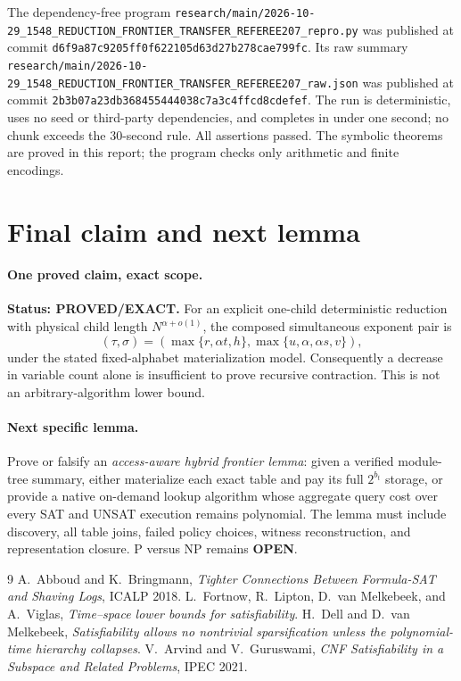 \documentclass[11pt]{article}
\newcommand{\Status}[1]{\textbf{Status: #1.}}
\begin{document}
The dependency-free program
\texttt{research/main/2026-10-29\_1548\_REDUCTION\_FRONTIER\_TRANSFER\_REFEREE207\_repro.py}
was published at commit \texttt{d6f9a87c9205ff0f622105d63d27b278cae799fc}.  Its raw summary
\texttt{research/main/2026-10-29\_1548\_REDUCTION\_FRONTIER\_TRANSFER\_REFEREE207\_raw.json}
was published at commit \texttt{2b3b07a23db368455444038c7a3c4ffcd8cdefef}.  The run is
deterministic, uses no seed or third-party dependencies, and completes in under one second; no chunk
exceeds the 30-second rule.  All assertions passed.  The symbolic theorems are proved in this report;
the program checks only arithmetic and finite encodings.

\section{Final claim and next lemma}

\paragraph{One proved claim, exact scope.}
\Status{PROVED/EXACT} For an explicit one-child deterministic reduction with physical child length
$N^{\alpha+o(1)}$, the composed simultaneous exponent pair is
\[
(\tau,\sigma)=
(\max\{r,\alpha t,h\},\max\{u,\alpha,\alpha s,v\}),
\]
under the stated fixed-alphabet materialization model.  Consequently a decrease in variable count
alone is insufficient to prove recursive contraction.  This is not an arbitrary-algorithm lower bound.

\paragraph{Next specific lemma.}
Prove or falsify an \emph{access-aware hybrid frontier lemma}: given a verified module-tree summary,
either materialize each exact table and pay its full $2^{b_t}$ storage, or provide a native on-demand
lookup algorithm whose aggregate query cost over every SAT and UNSAT execution remains polynomial.
The lemma must include discovery, all table joins, failed policy choices, witness reconstruction, and
representation closure.  P versus NP remains \textbf{OPEN}.

\begin{thebibliography}{9}
 A.~Abboud and K.~Bringmann,
\emph{Tighter Connections Between Formula-SAT and Shaving Logs}, ICALP 2018.
 L.~Fortnow, R.~Lipton, D.~van Melkebeek, and A.~Viglas,
\emph{Time--space lower bounds for satisfiability}.
 H.~Dell and D.~van Melkebeek,
\emph{Satisfiability allows no nontrivial sparsification unless the polynomial-time hierarchy collapses}.
 V.~Arvind and V.~Guruswami,
\emph{CNF Satisfiability in a Subspace and Related Problems}, IPEC 2021.
\end{thebibliography}

\end{document}
